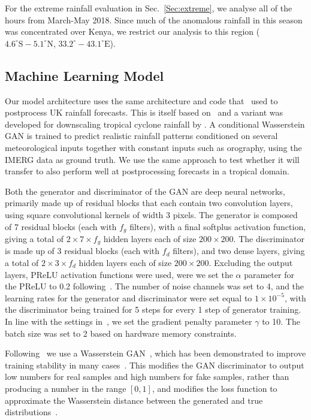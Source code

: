 \documentclass{article}
\begin{document}
For the extreme rainfall evaluation in Sec.~\ref{Sec:extreme}, we analyse all of the hours from March-May 2018. Since much of the anomalous rainfall in this season was concentrated over Kenya, we restrict our analysis to this region ($4.6^{\circ}\text{S}-5.1^{\circ}\text{N}$, $33.2^{\circ}-43.1^{\circ}\text{E}$).


\subsection{Machine Learning Model}




Our model architecture uses the same architecture and code that~\cite{harris_generative_2022} used to postprocess UK rainfall forecasts. This is itself based on~\cite{leinonen_stochastic_2020} and a variant was developed for downscaling tropical cyclone rainfall by \cite{vosper_deep_2023}. A conditional Wasserstein GAN is trained to predict realistic rainfall patterns conditioned on several meteorological inputs together with constant inputs such as orography, using the IMERG data as ground truth. We use the same approach to test whether it will transfer to also perform well at postprocessing forecasts in a tropical domain. 

Both the generator and discriminator of the GAN are deep neural networks, primarily made up of residual blocks that each contain two convolution layers, using square convolutional kernels of width 3 pixels. The generator is composed of 7 residual blocks (each with $f_g$ filters), with a final softplus activation function, giving a total of $2 \times 7 \times f_g$ hidden layers each of size $200 \times 200$. The discriminator is made up of 3 residual blocks (each with $f_d$ filters), and two dense layers, giving a total of $2 \times 3 \times f_d$ hidden layers each of size $200 \times 200$. 
Excluding the output layers, PReLU activation functions were used, were we set the $\alpha$ parameter for the PReLU to 0.2 following~\cite{harris_generative_2022}. The number of noise channels was set to 4, and the learning rates for the generator and discriminator were set equal to $1\times 10^{-5}$, with the discriminator being trained for 5 steps for every 1 step of generator training. In line with the settings in~\cite{gulrajani_improved_2017}, we set the gradient penalty parameter $\gamma$ to 10. The batch size was set to 2 based on hardware memory constraints.

Following~\cite{harris_generative_2022} we use a Wasserstein GAN~\citep{arjovsky_wasserstein_2017}, which has been demonstrated to improve training stability in many cases~\citep{creswell_generative_2018}. This modifies the GAN discriminator to output low numbers for real samples and high numbers for fake samples, rather than producing a number in the range $[0,1]$, and modifies the loss function to approximate the Wasserstein distance between the generated and true distributions~\citep{gulrajani_improved_2017}.
\end{document}
